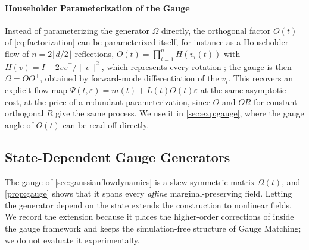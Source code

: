 \documentclass{article} %
\newcommand{\flow}{\Psi}
\newcommand{\gauge}{\Omega}
\begin{document}
\paragraph{Householder Parameterization of the Gauge}
Instead of parameterizing the generator $\gauge$ directly, the orthogonal factor $O(t)$ of \cref{eq:factorization} can be parameterized itself, for instance as a Householder flow \citep{tomczak2016improving} of $n = 2\lfloor d/2 \rfloor$ reflections, $O(t) = \prod_{i=1}^{n} H(v_i(t))$ with $H(v) = I - 2 v v^\top / \|v\|^2$, which represents every rotation \citep[Theorem 6.6]{grove2002classical}; the gauge is then $\gauge = \dot O O^\top$, obtained by forward-mode differentiation of the $v_i$. This recovers an explicit flow map $\flow(t, \varepsilon) = m(t) + L(t) O(t) \varepsilon$ at the same asymptotic cost, at the price of a redundant parameterization, since $O$ and $O R$ for constant orthogonal $R$ give the same process. We use it in \cref{sec:exp:gauge}, where the gauge angle of $O(t)$ can be read off directly.

\subsection{State-Dependent Gauge Generators}\label{sec:statedependentgauge}

The gauge of \cref{sec:gaussianflowdynamics} is a skew-symmetric matrix $\gauge(t)$, and \cref{prop:gauge} shows that it spans every \emph{affine} marginal-preserving field. Letting the generator depend on the state extends the construction to nonlinear fields. We record the extension because it places the higher-order corrections of \citet{smith2026closing} inside the gauge framework and keeps the simulation-free structure of Gauge Matching; we do not evaluate it experimentally.
\end{document}
